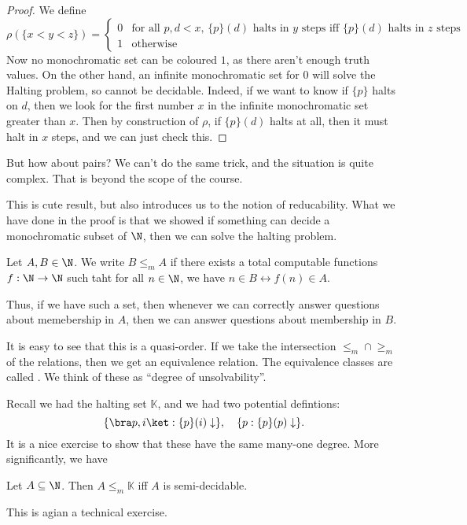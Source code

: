 \documentclass[a4paper]{article}
\newcommand\K{\mathbb{K}}
\begin{document}
\begin{proof}
  We define
  \[
    \rho(\{x < y < z\}) =
    \begin{cases}
      0 & \text{for all $p, d < x$, $\{p\}(d)$ halts in $y$ steps iff $\{p\}(d)$ halts in $z$ steps}\\
      1 & \text{otherwise}
    \end{cases}
  \]
  Now no monochromatic set can be coloured $1$, as there aren't enough truth values. On the other hand, an infinite monochromatic set for $0$ will solve the Halting problem, so cannot be decidable. Indeed, if we want to know if $\{p\}$ halts on $d$, then we look for the first number $x$ in the infinite monochromatic set greater than $x$. Then by construction of $\rho$, if $\{p\}(d)$ halts at all, then it must halt in $x$ steps, and we can just check this.
\end{proof}

But how about pairs? We can't do the same trick, and the situation is quite complex. That is beyond the scope of the course.

This is cute result, but also introduces us to the notion of reducability. What we have done in the proof is that we showed if something can decide a monochromatic subset of $\N$, then we can solve the halting problem.

\begin{defi}
  Let $A, B \in \N$. We write $B \leq_m A$ if there exists a total computable functions $f: \N \to \N$ such taht for all $n \in \N$, we have $n \in B \leftrightarrow f(n) \in A$.
\end{defi}
Thus, if we have such a set, then whenever we can correctly answer questions about memebership in $A$, then we can answer questions about membership in $B$.

It is easy to see that this is a quasi-order. If we take the intersection $\leq_m \cap \geq_m$ of the relations, then we get an equivalence relation. The equivalence classes are called . We think of these as ``degree of unsolvability''.

Recall we had the halting set $\K$, and we had two potential defintions:
\[
  \{\bra p, i\ket: \{p\} (i) \downarrow\},\quad \{p: \{p\}(p)\downarrow\}.
\]
It is a nice exercise to show that these have the same many-one degree. More significantly, we have
\begin{prop}
  Let $A \subseteq \N$. Then $A \leq_m \K$ iff $A$ is semi-decidable.
\end{prop}
This is agian a technical exercise.
\end{document}
